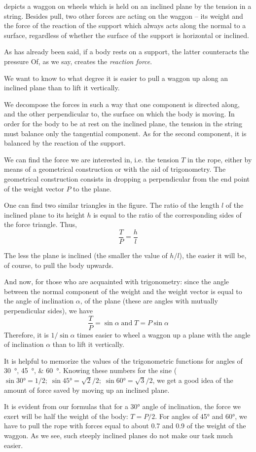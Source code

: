  depicts a waggon on wheels which is held on an
inclined plane by the tension in a string. Besides pull, two other
forces are acting on the waggon -- its weight and the force of the
reaction of the support which always acts along the normal to a
surface, regardless of whether the surface of the support is
horizontal or inclined.  

As has already been said, if a body rests
on a support, the latter counteracts the pressure Of, as we say,
creates the \emph{reaction force}.  

We want to know to what degree it is easier to pull a waggon up along
an inclined plane than to lift it vertically.  

We decompose the forces in such a way that one component is directed
along, and the other perpendicular to, the surface on which the body
is moving. In order for the body to be at rest on the inclined plane,
the tension in the string must balance only the tangential component.
As for the second component, it is balanced by the reaction of the
support.

We can find the force we are interested in, i.e. the tension $T$ in the
rope, either by means of a geometrical construction or with the aid of
trigonometry. The geometrical construction consists in dropping a
perpendicular from the end point of the weight vector $P$ to the plane.

One can find two similar triangles in the figure. The ratio of the
length $l$ of the inclined plane to its height $h$ is
equal to the ratio of the corresponding sides of the force
triangle. Thus,
\begin{equation*}
\frac{T}{P} = \frac{h}{l}
\end{equation*}

The less the plane is inclined (the smaller the value of
$h/l$), the easier it will be, of course, to pull the body
upwards.

And now, for those who are acquainted with trigonometry: since the
angle between the normal component of the weight and the weight vector is equal to the angle of inclination $\alpha$, of the plane (these are angles with mutually perpendicular sides), we have
\begin{equation*}
\frac{T}{P} = \sin \alpha \; \mathrm{and} \; T = P \sin \alpha
\end{equation*}
Therefore, it is $1/\sin \alpha$ times easier to wheel a
waggon up a plane with the angle of inclination $\alpha$ than to lift it vertically.  

It is helpful to memorize the values of the trigonometric functions for angles of \SIlist{30;45;60}{\degree}. Knowing these numbers for the sine ($\sin \ang{30} = 1/2; \; \sin \ang{45} = \sqrt{2}/2; \; \sin \ang{60} = \sqrt{3}/2$, we get a good idea of the amount of force saved by moving up an inclined plane.  

It is evident from our formulas that for a \ang{30} angle of
inclination, the force we exert will be half the weight of the body: $T = P/2$. For angles of \ang{45} and \ang{60}, we have to pull the rope with forces equal to about 0.7 and 0.9 of the weight of the waggon. As we see, such steeply inclined planes do not make our task much easier.
